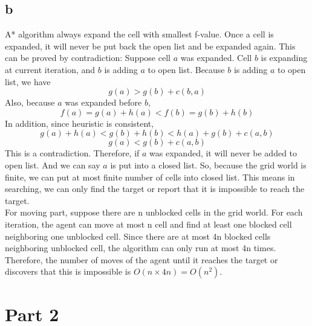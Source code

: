 \documentclass[11pt]{article}
\begin{document}
\subsection*{b}
 A* algorithm always expand the cell with smallest f-value. Once a cell is expanded, it will never be put back the open list and be expanded again. This can be proved by contradiction:
 \newline
 Suppose cell $a$ was expanded. Cell $b$ is expanding at current iteration, and $b$ is adding $a$ to open list.
 \newline
 Because $b$ is adding $a$ to open list, we have
 $$g(a) > g(b) + c(b, a)$$
 Also, because $a$ was expanded before $b$,
 $$f(a) = g(a) + h(a) < f(b) = g(b) + h(b)$$
 In addition, since heuristic is consistent,
 $$g(a) + h(a) < g(b) + h(b) < h(a) + g(b) + c(a, b)$$
 $$g(a) < g(b) + c(a, b)$$
 This is a contradiction. Therefore, if $a$ was expanded, it will never be added to open list. And we can say $a$ is put into a closed list.
 \newline
 So, because the grid world is finite, we can put at most finite number of cells into closed list. This means in searching, we can only find the target or report that it is impossible to reach the target.\\
 For moving part, suppose there are n unblocked cells in the grid world. For each iteration, the agent can move at most n cell and find at least one blocked cell neighboring one unblocked cell. Since there are at most 4n blocked cells neighboring unblocked cell, the algorithm can only run at most 4n times. Therefore, the number of moves of the agent until it reaches the target or discovers that this is impossible is $O(n\times 4n)=O(n^2)$.




\section*{Part 2}
\end{document}
